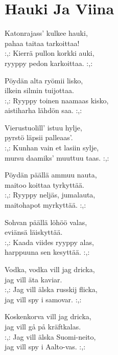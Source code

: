 \section{Hauki Ja Viina}
Katonrajass’ kulkee hauki,\\
pahaa taitaa tarkoittaa!\\
:,: Kierrä pullon korkki auki,\\
ryyppy pedon karkoittaa. :,:

Pöydän alta ryömii lisko,\\
ilkein silmin tuijottaa.\\
:,: Ryyppy toinen naamaas kisko,\\
aistiharha lähdön saa. :,:

Vierustuolill’ istuu hylje,\\
pyrstö läpsii palleaas’.\\
:,: Kunhan vain et lasiin sylje,\\
mursu daamiks’ muuttuu taas. :,:

Pöydän päällä ammuu nauta,\\
maitoo koittaa tyrkyttää.\\
:,: Ryyppy neljäs, jumalauta,\\
maitohapot myrkyttää. :,:

Sohvan päällä löhöö valas,\\
eviänsä läiskyttää.\\
:,: Kaada viides ryyppy alas,\\
harppuuna sen kesyttää. :,:

Vodka, vodka vill jag dricka,\\
jag vill äta kaviar.\\
:,: Jag vill älska russkij flicka,\\
jag vill spy i samovar. :,:

Koskenkorva vill jag dricka,\\
jag vill gå på kräftkalas.\\
:,: Jag vill älska Suomi-neito,\\
jag vill spy i Aalto-vas. :,: